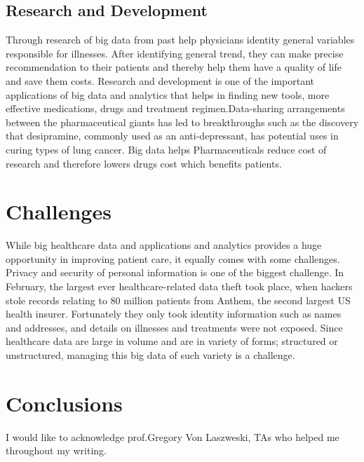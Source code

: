 \documentclass[sigconf]{acmart}
\begin{document}
\subsection{Research and Development}
Through research of big data from past help physicians identity general variables responsible for illnesses. After identifying 
general trend, they can make precise recommendation to their patients and thereby help them have a quality of life and save them costs. 
Research and development is one of the important applications of big data and
analytics that helps in finding new tools, more effective medications, drugs 
and treatment regimen.Data-sharing arrangements between the pharmaceutical giants has led to breakthroughs such as the 
discovery that desipramine, commonly used as an anti-depressant, has potential uses in curing types of 
lung cancer\cite{www-forbes-com}. Big data helps Pharmaceuticals reduce cost of research and therefore lowers drugs cost which 
benefits patients. 
 
 




\section{Challenges}
While big healthcare data and applications and analytics provides a huge opportunity in improving patient care, it equally comes 
with some challenges. 
Privacy and security of personal information is one of the biggest challenge.
In February, the largest ever healthcare-related data theft took place, when hackers stole records relating to 80 million patients 
from Anthem, the second largest US health insurer. Fortunately they only took identity information such as names and addresses, 
and details on illnesses and treatments were not exposed\cite{www-forbes-com}.
Since healthcare data are large in volume and are in variety of forms; structured or unstructured, managing this big data 
of such variety is a challenge. 




\section{Conclusions}







\appendix



\begin{acks}

I would like to acknowledge prof.Gregory Von Laszweski, TAs who helped me throughout my writing.  
\end{acks}


 
\end{document}
